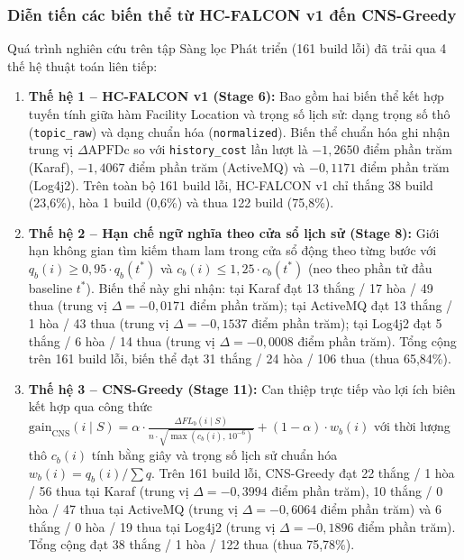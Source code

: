 \subsubsection{Diễn tiến các biến thể từ HC-FALCON v1 đến CNS-Greedy}
\label{subsubsec:variants_evolution}

Quá trình nghiên cứu trên tập Sàng lọc Phát triển (161 build lỗi) đã trải qua 4 thế hệ thuật toán liên tiếp:
\begin{enumerate}
    \item \textbf{Thế hệ 1 -- HC-FALCON v1 (Stage 6):} Bao gồm hai biến thể kết hợp tuyến tính giữa hàm Facility Location và trọng số lịch sử: dạng trọng số thô (\texttt{topic\_raw}) và dạng chuẩn hóa (\texttt{normalized}).
    Biến thể chuẩn hóa ghi nhận trung vị $\Delta\text{APFDc}$ so với \texttt{history\_cost} lần lượt là $-1,2650$ điểm phần trăm (Karaf), $-1,4067$ điểm phần trăm (ActiveMQ) và $-0,1171$ điểm phần trăm (Log4j2).
    Trên toàn bộ 161 build lỗi, HC-FALCON v1 chỉ thắng 38 build (23,6\%), hòa 1 build (0,6\%) và thua 122 build (75,8\%).
    \item \textbf{Thế hệ 2 -- Hạn chế ngữ nghĩa theo cửa sổ lịch sử (Stage 8):} Giới hạn không gian tìm kiếm tham lam trong cửa sổ động theo từng bước với $q_b(i) \ge 0{,}95 \cdot q_b(t^*)$ và $c_b(i) \le 1{,}25 \cdot c_b(t^*)$ (neo theo phần tử đầu baseline $t^*$).
    Biến thể này ghi nhận: tại Karaf đạt 13 thắng / 17 hòa / 49 thua (trung vị $\Delta = -0,0171$ điểm phần trăm); tại ActiveMQ đạt 13 thắng / 1 hòa / 43 thua (trung vị $\Delta = -0,1537$ điểm phần trăm); tại Log4j2 đạt 5 thắng / 6 hòa / 14 thua (trung vị $\Delta = -0,0008$ điểm phần trăm). Tổng cộng trên 161 build lỗi, biến thể đạt 31 thắng / 24 hòa / 106 thua (thua 65,84\%).
    \item \textbf{Thế hệ 3 -- CNS-Greedy (Stage 11):} Can thiệp trực tiếp vào lợi ích biên kết hợp qua công thức $\text{gain}_{\text{CNS}}(i \mid S) = \alpha \cdot \frac{\Delta FL_b(i \mid S)}{n \cdot \sqrt{\max\left(c_b(i), \, 10^{-6}\right)}} + (1 - \alpha) \cdot w_b(i)$ với thời lượng thô $c_b(i)$ tính bằng giây và trọng số lịch sử chuẩn hóa $w_b(i) = q_b(i) / \sum q$.
    Trên 161 build lỗi, CNS-Greedy đạt 22 thắng / 1 hòa / 56 thua tại Karaf (trung vị $\Delta = -0,3994$ điểm phần trăm), 10 thắng / 0 hòa / 47 thua tại ActiveMQ (trung vị $\Delta = -0,6064$ điểm phần trăm) và 6 thắng / 0 hòa / 19 thua tại Log4j2 (trung vị $\Delta = -0,1896$ điểm phần trăm). Tổng cộng đạt 38 thắng / 1 hòa / 122 thua (thua 75,78\%).

\end{enumerate}
